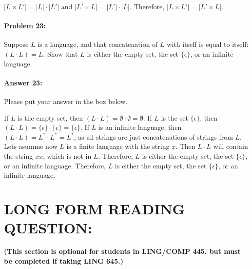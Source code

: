 \documentclass[10pt]{article}
\newenvironment{AnswerBox}{\begin{mdframed}[style=simple]}{\end{mdframed}}
\begin{document}
\begin{AnswerBox}%

  $|L \times L'| = |L| \cdot |L'|$ and $|L' \times L| = |L'| \cdot |L|$. Therefore, $|L \times L'| = |L' \times L|$.

\end{AnswerBox}%

\noindent\hrulefill %

\paragraph{Problem 23:}

Suppose $L$ is a language, and that concatenation of $L$ with itself is equal to
itself: $(L\cdot L) = L$. Show that $L$ is either the empty set,  the set
$\{\epsilon\}$, or an infinite language.

\paragraph{Answer 23:} Please put your answer in the box below.

\begin{AnswerBox}%

  If $L$ is the empty set, then $(L\cdot L) = \emptyset \cdot \emptyset = \emptyset$. If $L$ is the set $\{\epsilon\}$, then $(L\cdot L) = \{\epsilon\} \cdot \{\epsilon\} = \{\epsilon\}$. If $L$ is an infinite language, then $(L\cdot L) = L^* \cdot L^* = L^*$, as all strings are just concatenations of strings from $L$. Lets asumme now $L$ is a finite language with the string $x$. Then $L \cdot L$ will contain the string $xx$, which is not in $L$. Therefore, $L$ is either the empty set, the set $\{\epsilon\}$, or an infinite language.
  Therefore, $L$ is either the empty set, the set $\{\epsilon\}$, or an infinite language.

\end{AnswerBox}%


\newpage
\section*{LONG FORM READING QUESTION:} 
\textbf{(This section is optional for students in LING/COMP 445, but must be completed if taking LING 645.)}
\end{document}
